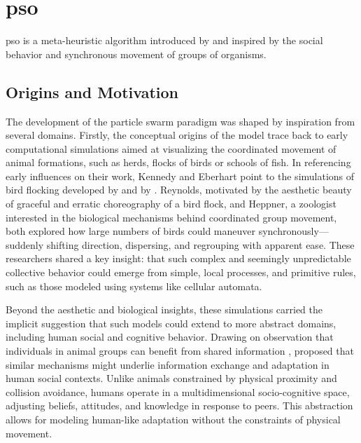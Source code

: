 \chapter[Particle Swarm Optimization (PSO)]{\acrfull{pso}}
\label{cp:pso}

{


\nocite{eberhart1995new}
\acrfull{pso}
is 
a meta-heuristic  algorithm
introduced by \citet{kennedy1995particle} and inspired by the social behavior and synchronous movement of groups of organisms.

\section{%
Origins and Motivation}
The development of the particle swarm paradigm was shaped by inspiration from several domains.
Firstly,
the
conceptual
origins of the
model
trace back to early computational simulations aimed at visualizing the coordinated movement of animal formations, such as herds, flocks of birds or schools of fish.
In referencing early influences on their work, Kennedy and Eberhart point to the simulations of bird flocking developed by \citet{reynolds1987flocks} and by \citet{heppner1990stochastic}. Reynolds, motivated by the aesthetic beauty of 
graceful and erratic choreography of a bird flock,
and Heppner, a zoologist interested in the biological mechanisms behind coordinated group movement, both explored how large numbers of birds could maneuver synchronously---suddenly shifting direction, dispersing, and regrouping with apparent ease. These researchers shared a key insight: that such complex and seemingly unpredictable collective behavior could emerge from simple, local processes,
and primitive rules,
such as those modeled using systems like cellular automata.

Beyond the aesthetic and biological insights, these simulations carried the implicit suggestion that such models could extend to more abstract domains, including human social and cognitive behavior. Drawing on observation that individuals in animal groups can benefit from shared information \parencite{wilson1975sociobiology}, \citeauthor{kennedy1995particle} proposed that similar mechanisms might underlie information exchange and adaptation in human social contexts. Unlike animals constrained by physical proximity and collision avoidance, humans operate in a multidimensional socio-cognitive space, adjusting beliefs, attitudes, and knowledge in response to peers. This abstraction allows for modeling human-like adaptation without the constraints of physical movement.



}
